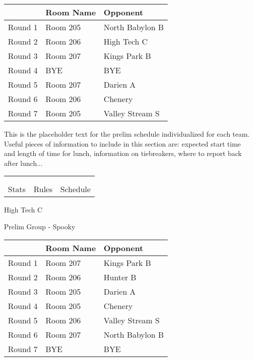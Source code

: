 \documentclass{article}%
\begin{document}
\vspace*{4pt}%
\begin{tabularx}{\textwidth}{|c|Y|Y|}%
\hline%
&Room Name&Opponent\\%
\hline%
Round 1&Room 205&North Babylon B\\%
Round 2&Room 206&High Tech C\\%
Round 3&Room 207&Kings Park B\\%
Round 4&BYE&BYE\\%
Round 5&Room 207&Darien A\\%
Round 6&Room 206&Chenery\\%
Round 7&Room 205&Valley Stream S\\%
\hline%
\end{tabularx}%
\vspace*{30pt}%
\linebreak%
This is the placeholder text for the prelim schedule individualized for each team. Useful pieces of information to include in this section are: expected start time and length of time for lunch, information on tiebreakers, where to report back after lunch...%
\vspace*{30pt}%
\newline%
%
\begin{tabularx}{\textwidth}{YYY}%
  &  &  \\%
\\%
Stats&Rules&Schedule\\%
\end{tabularx}%
\newpage%
%
\begin{center}%
\begin{Huge}%
High Tech C%
\end{Huge}%
\vspace*{12pt}%
\linebreak%
\begin{Large}%
Prelim Group {-} Spooky%
\end{Large}%
\end{center}%
\vspace*{4pt}%
\begin{tabularx}{\textwidth}{|c|Y|Y|}%
\hline%
&Room Name&Opponent\\%
\hline%
Round 1&Room 207&Kings Park B\\%
Round 2&Room 206&Hunter B\\%
Round 3&Room 205&Darien A\\%
Round 4&Room 205&Chenery\\%
Round 5&Room 206&Valley Stream S\\%
Round 6&Room 207&North Babylon B\\%
Round 7&BYE&BYE\\%
\hline%
\end{tabularx}%
\end{document}
